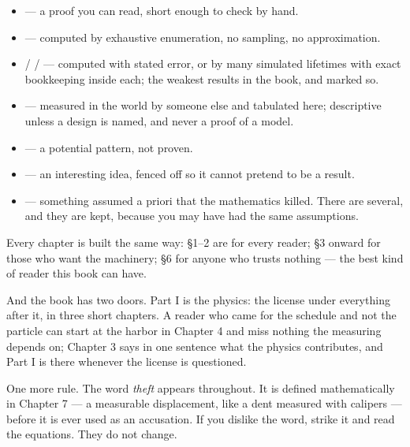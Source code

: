 \begin{itemize}
\tightlist
\item
   --- a proof you can read, short enough to check by hand.
\item
   --- computed by exhaustive enumeration, no sampling, no
  approximation.
\item
   /  /  --- computed with stated
  error, or by many simulated lifetimes with exact bookkeeping inside
  each; the weakest results in the book, and marked so.
\item
   --- measured in the world by someone else and tabulated
  here; descriptive unless a design is named, and never a proof of a
  model.
\item
   --- a potential pattern, not proven.
\item
   --- an interesting idea, fenced off so it cannot
  pretend to be a result.
\item
   --- something assumed a priori that the
  mathematics killed. There are several, and they are kept, because
  you may have had the same assumptions.
\end{itemize}

Every chapter is built the same way: §1--2 are for every reader; §3
onward for those who want the machinery; §6 for anyone who trusts
nothing --- the best kind of reader this book can have.

\pagekey

And the book has two doors. Part I is the physics: the license under
everything after it, in three short chapters. A reader who came for
the schedule and not the particle can start at the harbor in Chapter 4
and miss nothing the measuring depends on; Chapter 3 says in one
sentence what the physics contributes, and Part I is there whenever
the license is questioned.

One more rule. The word \emph{theft} appears throughout. It is defined
mathematically in Chapter 7 --- a measurable displacement, like a dent
measured with calipers --- before it is ever used as an accusation. If you
dislike the word, strike it and read the equations. They do not change.

\renewcommand{\partlist}{\partline{1}{The sealed verdict}{ch1}\partline{2}{The price of locality, in one chapter}{ch2}\partline{3}{Apparent non-determinism: the claim, precisely}{ch3}}\renewcommand{\runninghead}{The Verdict and the Appeal}

